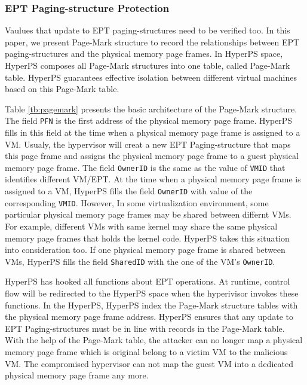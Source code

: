 
\subsubsection{EPT Paging-structure Protection}%
\label{ssub:ept_paging_structure_protection}
Vaulues that update to EPT paging-structures need to be verified too. In this paper, we present Page-Mark structure to record the relationships between EPT paging-structures and the physical memory page frames. In HyperPS space, HyperPS composes all Page-Mark structures into one table, called Page-Mark table.
HyperPS guarantees effective isolation between different virtual machines based on this Page-Mark table. 

Table \ref{tb:pagemark} presents the basic architecture of the Page-Mark structure.
The field \verb|PFN| is the first address of the physical memory page frame. HyperPS fills in this field at the time when a physical memory page frame is assigned to a VM. Usualy, the hypervisor will creat a new EPT Paging-structure that maps this page frame and assigns the physical memory page frame to a guest physical memory page frame. The field \verb|OwnerID| is the same as the value of \verb|VMID| that identifies different VM/EPT. At the time when a physical memory page frame is assigned to a VM, HyperPS fills the field \verb|OwnerID| with value of the corresponding \verb|VMID|. However, In some virtualization environment, some particular physical memory page frames may be shared between differnt VMs. For example, different VMs with same kernel may share the same physical memory page frames that holds the kernel code. HyperPS takes this situation into consideration too. If one physical memory page frame is shared between VMs, HyperPS fills the field \verb|SharedID| with the one of the VM's \verb|OwnerID|.

HyperPS has hooked all functions about EPT operations.
At runtime, control flow will be redirected to the HyperPS space when the hyperivisor invokes these functions. 
In the HyperPS, HyperPS index the Page-Mark structure tables with the physical memory page frame address. 
HyperPS ensures that any update to EPT Paging-structures must be in line with records in the Page-Mark table.
With the help of the Page-Mark table, the attacker can no longer map a physical memory page frame which is original belong to a victim VM to the malicious VM. The compromised hypervisor can not map the guest VM into a dedicated physical memory page frame any more. 

